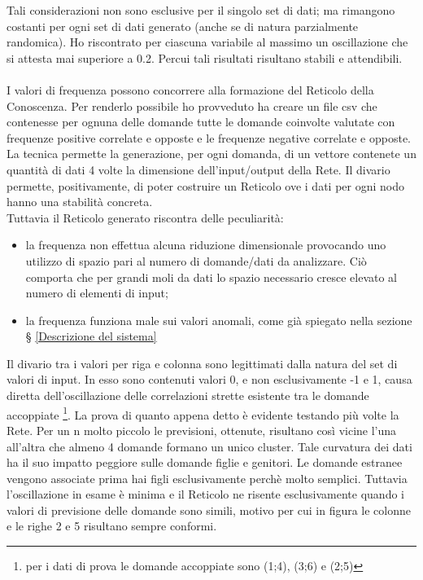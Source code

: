 \noindent
Tali considerazioni non sono esclusive per il singolo set di dati; ma rimangono costanti per ogni set di dati generato (anche se di natura parzialmente randomica). Ho riscontrato per ciascuna variabile al massimo un oscillazione che si attesta mai superiore a 0.2. Percui tali risultati risultano stabili e attendibili.
\\\\
I valori di frequenza possono concorrere alla formazione del Reticolo della Conoscenza. Per renderlo possibile ho provveduto ha creare un file csv che contenesse per ognuna delle domande tutte le domande coinvolte valutate con frequenze positive correlate e opposte e le frequenze negative correlate e opposte. La tecnica permette la generazione, per ogni domanda, di un vettore contenete un quantit\`a di dati 4 volte la dimensione dell'input/output della Rete.
Il divario permette, positivamente, di poter costruire un Reticolo ove i dati per ogni nodo hanno una stabilit\`a concreta.\\
Tuttavia il Reticolo generato riscontra delle peculiarit\`a:
\begin{itemize}
\item la frequenza non effettua alcuna riduzione dimensionale provocando uno utilizzo di spazio pari al numero di domande/dati da analizzare. Ci\`o comporta che per grandi moli da dati lo spazio necessario cresce elevato al numero di elementi di input;
\item la frequenza funziona male sui valori anomali, come gi\`a spiegato nella sezione § \ref{Descrizione del sistema}
\end{itemize}
\noindent
Il divario tra i valori per riga e colonna sono legittimati dalla natura del set di valori di input. In esso sono contenuti valori 0, e non esclusivamente -1 e 1, causa diretta dell'oscillazione delle correlazioni strette esistente tra le domande accoppiate \footnote{per i dati di prova le domande accoppiate sono (1;4), (3;6) e (2;5)}. La prova di quanto appena detto \`e evidente testando pi\`u volte la Rete. Per un n molto piccolo le previsioni, ottenute, risultano cos\`i vicine l'una all'altra che almeno 4 domande formano un unico cluster.
Tale curvatura dei dati ha il suo impatto peggiore sulle domande figlie e genitori. Le domande estranee vengono associate prima hai figli esclusivamente perch\`e molto semplici. Tuttavia l'oscillazione in esame \`e minima e il Reticolo ne risente esclusivamente quando i valori di previsione delle domande sono simili, motivo per cui in figura le colonne e le righe 2 e 5 risultano sempre conformi. 





